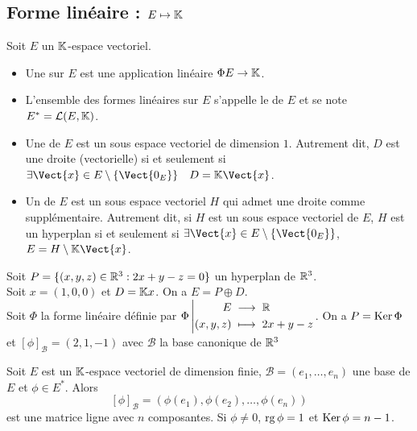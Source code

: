 \documentclass{book}
\begin{document}
\subsection{Forme linéaire : $E\mapsto \mathbb{K} $}
\begin{Definition}

Soit $E$ un $\mathbb{K} $-espace vectoriel.
\begin{itemize}
\item
  Une  sur $E$ est une application linéaire $\Phi E\to \mathbb{K} $.
\item  L'ensemble des formes linéaires sur $E$ s'appelle le  de $E$  et se note $E^* = \mathcal{L}(E,\mathbb{K} )$.
\item
  Une  de $E$ est un sous espace vectoriel de dimension $1$.
  Autrement dit, $D$ est une droite (vectorielle) si et seulement si $\exists  \Vect{x}\in  E\setminus \{\Vect{0_E}\} \quad D =\K \Vect{x}$.
\item
  Un  de $E$ est un sous espace vectoriel $H$
  qui admet une droite comme supplémentaire.
  Autrement dit, si $H$ est un sous espace vectoriel de $E$,
  $H$ est un hyperplan si et seulement si  $\exists  \Vect{x}\in  E\setminus \{\Vect{0_E}\}$, $E = H\setminus \K \Vect{x}$.
\end{itemize}
\end{Definition}
\begin{Exemple}
Soit $P = \{(x,y,z)\in  \mathbb{R} ^3:2x+y-z=0\}$ un hyperplan de $\mathbb{R}^3$.\\
Soit $x = (1,0,0)$ et $D = \mathbb{K} x$. On a $E = P \oplus D$.\\
Soit $\Phi$ la forme linéaire définie par $ {\Phi }\left|\begin{aligned}{E}&\;\longrightarrow\;{\mathbb{R} }\\{(x,y,z)}&\;\longmapsto\;{2x+y-z}\end{aligned}\right.$. On a $P = \operatorname{Ker} \Phi $ et $[\phi]_{\mathcal{B}}=(2,1,-1)$ avec $\mathcal{B}$ la base canonique de $\mathbb{R} ^3$
\end{Exemple}
\begin{Proposition} 
Soit $E$ est un $\mathbb{K} $-espace vectoriel de dimension finie, $\mathcal{B}=(e_1,\dots,e_n)$ une base de $E$ et $\phi\in E^*$. Alors   $$[\phi]_{\mathcal{B}}=(\phi(e_1),\phi(e_2),\dots,\phi(e_n))$$ est une matrice ligne avec $n$ composantes. Si $\phi\neq 0$, $\operatorname{rg} \phi =1$ et $\operatorname{Ker} \phi =n-1$.
\end{Proposition}
\end{document}
